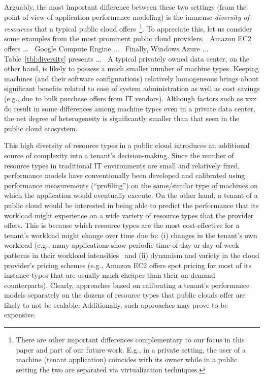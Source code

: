 \documentclass{acm_proc_article-sp}
\newcommand{\bu}[1]{#1}%
\newcommand{\mm}[1]{{\color{red}#1}}
\begin{document}
{Arguably, the most important difference between  these two settings (from the point of view of application performance modeling) is the immense {\it diversity of resources} that a typical public cloud offers~\footnote{There are other important differences complementary to our focus in this paper and part of our future work. E.g., in a private setting, the user of a machine (tenant application) coincides with its owner while in a public setting the two are separated via virtualization techniques. }. To appreciate this, let us consider some examples from the most prominent public cloud providers.} ~\mm{Amazon EC2 offers ...~\cite{amazonec2} Google Compute Engine ...~\cite{googlecomputeengine} Finally, Windows Azure ...~\cite{windowsazure} Table~\ref{tbl:diversity} presents ...} ~\bu{A typical privately owned data center, on the other hand, is likely to possess a much smaller number of machine types. Keeping machines (and their software configurations) relatively homogeneous brings about significant benefits related to ease of system administration as well as cost savings (e.g., due to bulk purchase offers from IT vendors). Although factors such as xxx do result in some differences among machine types even in a private data center, the net degree of heterogeneity is significantly smaller than that seen in the public cloud ecosystem. 

This high diversity of resource types in a public cloud introduces an additional source of complexity into a tenant's decision-making. Since the number of resource types in traditional IT environments are small and relatively fixed, performance models have conventionally been developed and calibrated using performance measurements (``profiling'') on the same/similar type of machines on which the application would eventually execute. On the other hand, a tenant of a public cloud would be interested in being able to predict the performance that its workload might experience on a wide variety of resource types that the provider offers. This is because which resource types are the most cost-effective for a tenant's workload might change over time due to: (i) changes in the tenant's own workload (e.g., many applications show periodic time-of-day or day-of-week patterns in their workload intensities~\cite{xxx} and (ii) dynamism and variety in the cloud provider's pricing schemes (e.g., Amazon EC2 offers spot pricing for most of its instance types that are usually much cheaper than their on-demand counterparts). Clearly, approaches based on calibrating a tenant's performance models separately on the dozens of resource types that public clouds offer are likely to not be scalable. Additionally, such approaches may prove to be expensive. 

}
\end{document}
